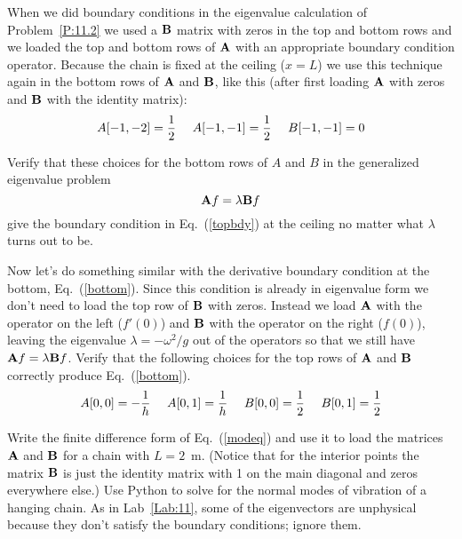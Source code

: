   When we did boundary conditions in the
eigenvalue calculation of Problem~\ref{P:11.2} we used a $\bf B$
matrix with zeros in the top and bottom rows and we loaded the
top and bottom rows of $\bf A$ with an appropriate boundary
condition operator. Because the chain is fixed at the ceiling
($x=L$) we use this technique again in the bottom rows of $\bf
A$ and $\bf B$, like this (after first loading $\bf A$ with zeros
and $\bf B$ with the identity matrix):
\begin{equation}
    A[-1,-2]={1 \over 2}~~~~A[-1,-1]={1 \over 2} ~~~~B[-1,-1]=0
\end{equation}

\begin{enumerate}
\probtwo \label{P:12.2}
\begin{enumerate}
\subprob
Verify that these choices for the bottom rows of $A$ and $B$ in the
generalized eigenvalue problem
\begin{equation}
    {\bf A} f = \lambda {\bf B} f
\end{equation}
give the boundary condition in Eq.~(\ref{topbdy})
at the ceiling no matter what
$\lambda$ turns out to be.


\subprob


    Now let's do something similar with the derivative
    boundary condition at the bottom, Eq.~(\ref{bottom}).
    Since this condition is already in eigenvalue form we
    don't need to load the top row of $\bf B$ with zeros.
    Instead we load $\bf A$ with the operator on the left
    ($f'(0)$) and $\bf B$ with the operator on the right
    ($f(0)$), leaving the eigenvalue $\lambda=-\omega^2/g$
    out of the operators so that we still have ${\bf A} f =
    \lambda {\bf B} f$. Verify that the following choices for
    the top rows of $\bf A$ and $\bf B$ correctly produce
    Eq.~(\ref{bottom}).
    \begin{equation}
        A[0,0]=-{1 \over h} ~~~~
        A[0,1]={1 \over h} ~~~~
        B[0,0]={1 \over 2} ~~~~
        B[0,1]={1 \over 2}
    \end{equation}


\subprob

Write the finite difference form of Eq.~(\ref{modeq})
and use it to load the matrices $\bf A$ and $\bf B$ for
a chain with $L=2$~m. (Notice that for the interior points the
matrix $\bf B$ is just the identity matrix with 1 on the
main diagonal and zeros everywhere else.) Use Python to
solve for the normal modes of vibration of a hanging
chain. As in Lab~\ref{Lab:11}, some of the eigenvectors
are unphysical because they don't satisfy the boundary
conditions; ignore them.


\end{enumerate}
\end{enumerate}
